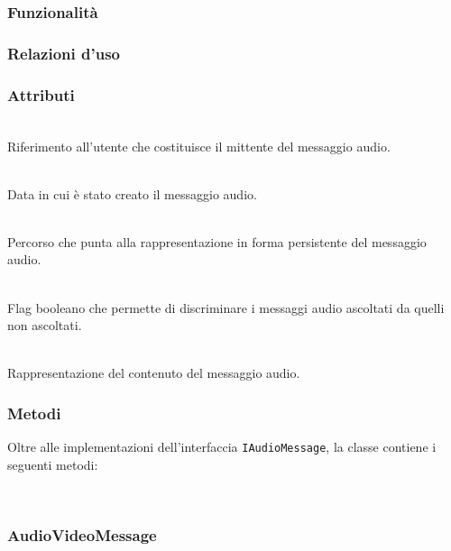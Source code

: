 \subsubsection*{Funzionalità}

\subsubsection*{Relazioni d'uso}

\subsubsection*{Attributi}
\begin{description}
  \item{}\\
Riferimento all'utente che costituisce il mittente del messaggio audio.
  \item{}\\
Data in cui è stato creato il messaggio audio.
  \item{}\\
Percorso che punta alla rappresentazione in forma persistente del messaggio audio.
  \item{}\\
Flag booleano che permette di discriminare i messaggi audio ascoltati da quelli non ascoltati.
  \item{}\\
Rappresentazione del contenuto del messaggio audio.
\end{description}

\subsubsection*{Metodi}
Oltre alle implementazioni dell'interfaccia \texttt{IAudioMessage}, la classe contiene i seguenti metodi:
\begin{description}
  \item{}\\
\end{description}

\subsubsection{AudioVideoMessage}\label{sec:audiovideomessage}

